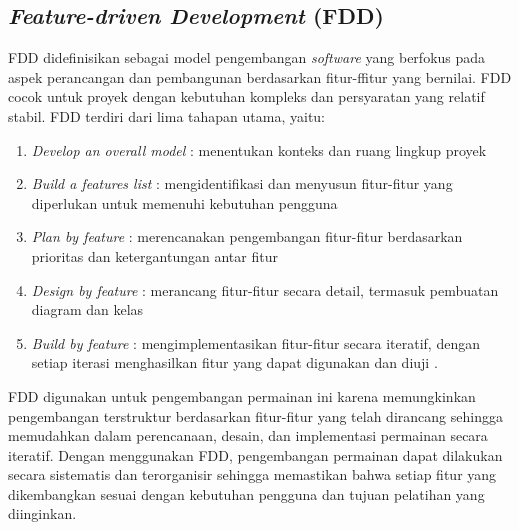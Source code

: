 \subsection{\textit{Feature-driven Development} (FDD)}
FDD didefinisikan sebagai model pengembangan \textit{software} yang berfokus pada aspek perancangan dan pembangunan berdasarkan fitur-ffitur yang bernilai. FDD cocok untuk proyek dengan kebutuhan kompleks dan persyaratan yang relatif stabil. 
FDD terdiri dari lima tahapan utama, yaitu:
\begin{enumerate}		
\item \textit{Develop an overall model} : menentukan konteks dan ruang lingkup proyek
\item \textit{Build a features list} : mengidentifikasi dan menyusun fitur-fitur yang diperlukan untuk memenuhi kebutuhan pengguna
\item \textit{Plan by feature} : merencanakan pengembangan fitur-fitur berdasarkan prioritas dan ketergantungan antar fitur
\item \textit{Design by feature} : merancang fitur-fitur secara detail, termasuk pembuatan diagram dan kelas
\item \textit{Build by feature} : mengimplementasikan fitur-fitur secara iteratif, dengan setiap iterasi menghasilkan fitur yang dapat digunakan dan diuji  \cite{Aftab_Nawaz_Anwer_Ahmad_Iqbal_Ahmad_Salman_2019}.
\end{enumerate}

FDD digunakan untuk pengembangan permainan ini karena memungkinkan pengembangan terstruktur berdasarkan fitur-fitur yang telah dirancang sehingga memudahkan dalam perencanaan, desain, dan implementasi permainan secara iteratif. Dengan menggunakan FDD, pengembangan permainan dapat dilakukan secara sistematis dan terorganisir sehingga memastikan bahwa setiap fitur yang dikembangkan sesuai dengan kebutuhan pengguna dan tujuan pelatihan yang diinginkan.
